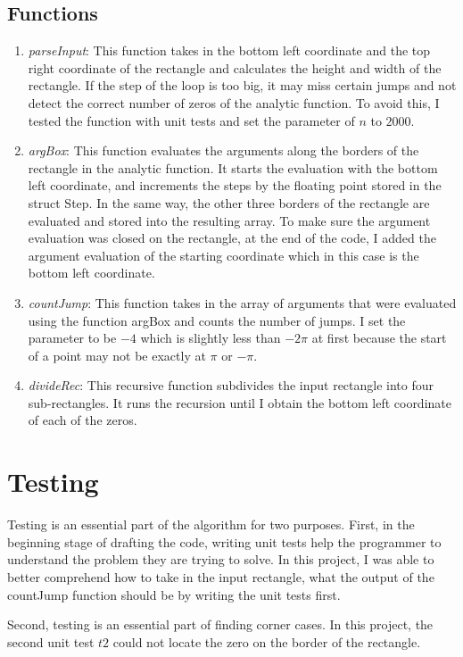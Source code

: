 \documentclass[11pt,reqno,oneside,a4paper]{article}
\begin{document}
\subsection{Functions}
	\begin{enumerate}
		\item \emph{parseInput}: 
		This function takes in the bottom left coordinate and the top right coordinate of the rectangle and calculates the height and width of the rectangle. 
		If the step of the loop is too big, it may miss certain jumps and not detect the correct number of zeros of the analytic function.
		To avoid this, I tested the function with unit tests and set the parameter of $n$ to $2000.$ 
		
		\item \emph{argBox}:
		This function evaluates the arguments along the borders of the rectangle in the analytic function. 
		It starts the evaluation with the bottom left coordinate, and increments the steps by the floating point stored in the struct Step. 
		In the same way, the other three borders of the rectangle are evaluated and stored into the resulting array. 
		To make sure the argument evaluation was closed on the rectangle, at the end of the code, I added the argument evaluation of the starting coordinate which in this case is the bottom left coordinate.
		
		\item \emph{countJump}: 
		This function takes in the array of arguments that were evaluated using the function argBox and counts the number of jumps.
		I set the parameter to be $-4$ which is slightly less than $-2\pi$ at first because the start of a point may not be exactly at $\pi$ or $-\pi.$ 
		
		\item \emph{divideRec}:
		This recursive function subdivides the input rectangle into four sub-rectangles.
		It runs the recursion until I obtain the bottom left coordinate of each of the zeros. 
		
		
	\end{enumerate}

\section{Testing}
	
Testing is an essential part of the algorithm for two purposes. 
First, in the beginning stage of drafting the code, writing unit tests help the programmer to understand the problem they are trying to solve. 
In this project, I was able to better comprehend how to take in the input rectangle, what the output of the countJump function should be by writing the unit tests first.

Second, testing is an essential part of finding corner cases. 
In this project, the second unit test $t2$ could not locate the zero on the border of the rectangle. 
	
	
	
	
	
	
	
	
	
	
	
	
	
	
	
	
	
	
\end{document}
